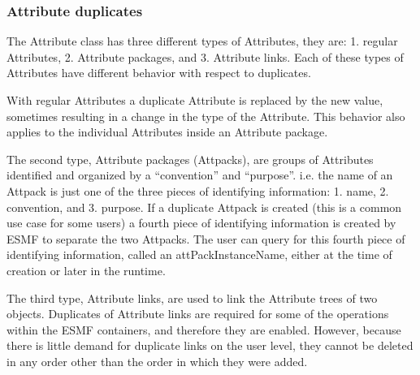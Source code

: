 \subsubsection{Attribute duplicates}

The Attribute class has three different types of Attributes, they are: 1. regular Attributes, 2. Attribute packages, and 3. Attribute links.  Each of these types of Attributes have different behavior with respect to duplicates.

With regular Attributes a duplicate Attribute is replaced by the new value, sometimes resulting in a change in the type of the Attribute.  This behavior also applies to the individual Attributes inside an Attribute package.

The second type, Attribute packages (Attpacks), are groups of Attributes identified and organized by a “convention” and “purpose”.  i.e. the name of an Attpack is just one of the three pieces of identifying information: 1. name, 2. convention, and 3. purpose.  If a duplicate Attpack is created (this is a common use case for some users) a fourth piece of identifying information is created by ESMF to separate the two Attpacks. The user can query for this fourth piece of identifying information, called an attPackInstanceName, either at the time of creation or later in the runtime.

The third type, Attribute links, are used to link the Attribute trees of two objects.  Duplicates of Attribute links are required for some of the operations within the ESMF containers, and therefore they are enabled.  However, because there is little demand for duplicate links on the user level, they cannot be deleted in any order other than the order in which they were added.
